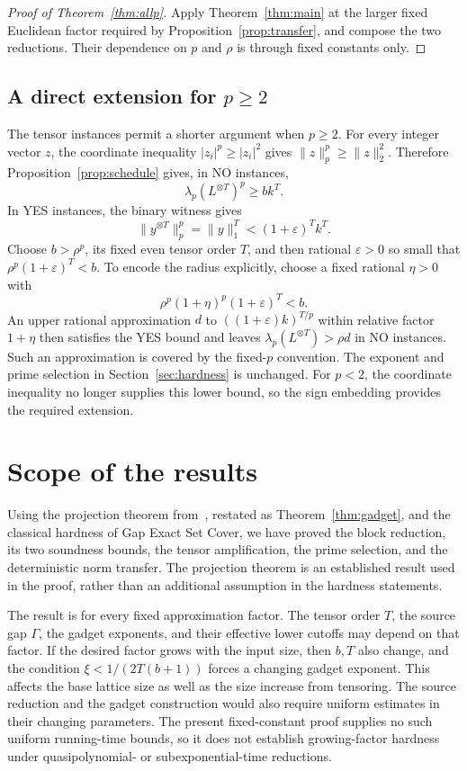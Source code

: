 \documentclass[11pt,letterpaper]{article}
\numberwithin{equation}{section}
\theoremstyle{definition}
\theoremstyle{remark}
\begin{document}
\begin{proof}[Proof of Theorem~\ref{thm:allp}]
Apply Theorem~\ref{thm:main} at the larger fixed Euclidean factor required by Proposition~\ref{prop:transfer}, and compose the two reductions. Their dependence on $p$ and $\rho$ is through fixed constants only.
\end{proof}

\subsection{A direct extension for \texorpdfstring{$p\ge2$}{p >= 2}}
The tensor instances permit a shorter argument when $p\ge2$. For every integer vector $z$, the coordinate inequality $|z_i|^p\ge|z_i|^2$ gives $\|z\|_p^p\ge\|z\|_2^2$. Therefore Proposition~\ref{prop:schedule} gives, in NO instances,
\[
 \lambda_p(L^{\otimes T})^p\ge bk^T.
\]
In YES instances, the binary witness gives
\[
 \|y^{\otimes T}\|_p^p=\|y\|_1^T<(1+\varepsilon)^Tk^T.
\]
Choose $b>\rho^p$, its fixed even tensor order $T$, and then rational $\varepsilon>0$ so small that $\rho^p(1+\varepsilon)^T<b$. To encode the radius explicitly, choose a fixed rational $\eta>0$ with
\[
 \rho^p(1+\eta)^p(1+\varepsilon)^T<b.
\]
An upper rational approximation $d$ to $((1+\varepsilon)k)^{T/p}$ within relative factor $1+\eta$ then satisfies the YES bound and leaves $\lambda_p(L^{\otimes T})>\rho d$ in NO instances. Such an approximation is covered by the fixed-$p$ convention. The exponent and prime selection in Section~\ref{sec:hardness} is unchanged. For $p<2$, the coordinate inequality no longer supplies this lower bound, so the sign embedding provides the required extension.

\section{Scope of the results}\label{sec:scope}
Using the projection theorem from~\cite{wan}, restated as Theorem~\ref{thm:gadget}, and the classical hardness of Gap Exact Set Cover, we have proved the block reduction, its two soundness bounds, the tensor amplification, the prime selection, and the deterministic norm transfer. The projection theorem is an established result used in the proof, rather than an additional assumption in the hardness statements.

The result is for every fixed approximation factor. The tensor order $T$, the source gap $\Gamma$, the gadget exponents, and their effective lower cutoffs may depend on that factor. If the desired factor grows with the input size, then $b,T$ also change, and the condition $\xi<1/(2T(b+1))$ forces a changing gadget exponent. This affects the base lattice size as well as the size increase from tensoring. The source reduction and the gadget construction would also require uniform estimates in their changing parameters. The present fixed-constant proof supplies no such uniform running-time bounds, so it does not establish growing-factor hardness under quasipolynomial- or subexponential-time reductions.
\end{document}
